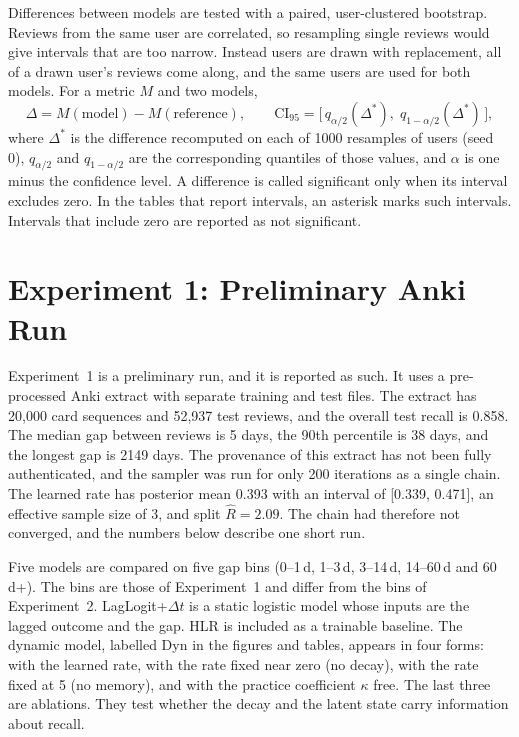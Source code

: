 Differences between models are tested with a paired, user-clustered bootstrap. Reviews from the same
user are correlated, so resampling single reviews would give intervals that are too narrow. Instead
users are drawn with replacement, all of a drawn user's reviews come along, and the same users are
used for both models. For a metric $M$ and two models,
\begin{equation}\label{eq:boot}
  \Delta = M(\text{model}) - M(\text{reference}), \qquad
  \mathrm{CI}_{95} = \bigl[\,q_{\alpha/2}(\Delta^{*}),\; q_{1-\alpha/2}(\Delta^{*})\,\bigr],
\end{equation}
where $\Delta^{*}$ is the difference recomputed on each of 1000 resamples of users (seed 0),
$q_{\alpha/2}$ and $q_{1-\alpha/2}$ are the corresponding quantiles of those values, and $\alpha$ is
one minus the confidence level. A difference is called significant only when its interval excludes zero. In the tables that report intervals, an asterisk marks such intervals. Intervals
that include zero are reported as not significant.

\section{Experiment 1: Preliminary Anki Run}
\label{sec:results-exp1}

Experiment~1 is a preliminary run, and it is reported as such. It uses a pre-processed Anki extract with
separate training and test files. The extract has 20,000 card sequences and 52,937 test reviews, and
the overall test recall is 0.858. The median gap between reviews is 5 days, the 90th percentile is 38
days, and the longest gap is 2149 days. The provenance of this extract has not been fully
authenticated, and the sampler was run for only 200 iterations as a single chain. The learned rate has
posterior mean 0.393 with an interval of [0.339, 0.471], an effective sample size of 3, and split
$\hat R = 2.09$. The chain had therefore not converged, and the numbers below describe one short run.

Five models are compared on five gap bins (0--1\,d, 1--3\,d, 3--14\,d, 14--60\,d and 60\,d+). The bins
are those of Experiment~1 and differ from the bins of Experiment~2. LagLogit+$\Delta t$ is a static
logistic model whose inputs are the lagged outcome and the gap. HLR is included as a trainable baseline.
The dynamic model, labelled Dyn in the figures and tables, appears in four forms: with the learned
rate, with the rate fixed near zero (no decay), with the rate fixed at 5 (no memory), and with the
practice coefficient $\kappa$ free. The last three are ablations. They test whether the decay and the
latent state carry information about recall.


